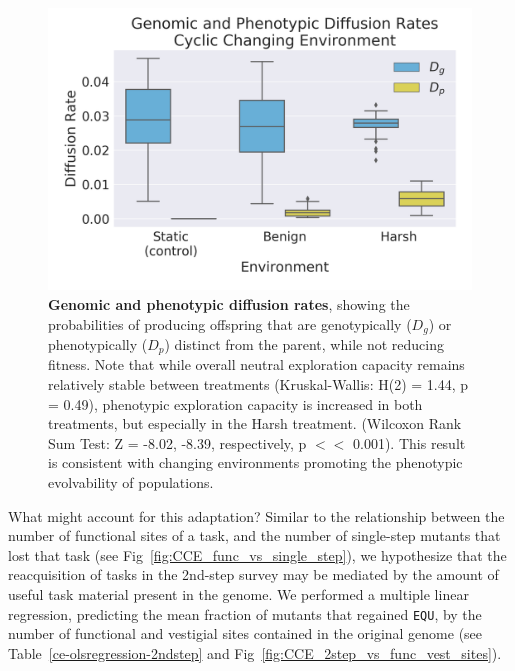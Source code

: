 \documentclass[10pt,letterpaper,final]{article}
\begin{document}
	\begin{figure}[!h] %
	\includegraphics[width=0.95\columnwidth]{figures/CE/CCE_D_g_D_p__box.png}
	\caption{\textbf{Genomic and phenotypic diffusion rates}, showing the probabilities of producing offspring that are genotypically ($D_g$) or phenotypically ($D_p$) distinct from the parent, while not reducing fitness.
	Note that while overall neutral exploration capacity remains relatively stable between treatments (Kruskal-Wallis: H(2) = 1.44, p = 0.49), phenotypic exploration capacity is increased in both treatments, but especially in the Harsh treatment. (Wilcoxon Rank Sum Test: Z = -8.02, -8.39, respectively, p $<<$ 0.001). This result is consistent with changing environments promoting the phenotypic evolvability of populations.
	}\label{fig:CCE_diffusion_rate}
	\end{figure}
What might account for this adaptation? Similar to the relationship between the number of functional sites of a task, and the number of single-step mutants that lost that task (see Fig~\ref{fig:CCE_func_vs_single_step}), we hypothesize that the reacquisition of tasks in the 2nd-step survey may be mediated by the amount of useful task material present in the genome. We performed a multiple linear regression, predicting the mean fraction of mutants that regained \texttt{EQU}, by the number of functional and vestigial sites contained in the original genome (see Table~\ref{ce-olsregression-2ndstep} and Fig~\ref{fig:CCE_2step_vs_func_vest_sites}).
\end{document}
